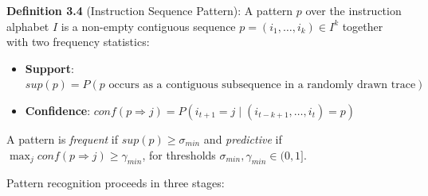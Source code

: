 \documentclass[
  sigconf,
  anonymous]{acmart}
\providecommand{\tightlist}{%
  \setlength{\itemsep}{0pt}\setlength{\parskip}{0pt}}
\begin{document}
\textbf{Definition 3.4} (Instruction Sequence Pattern): A pattern \(p\)
over the instruction alphabet \(I\) is a non-empty contiguous sequence
\(p = (i_1, \dots, i_k) \in I^k\) together with two frequency
statistics:

\begin{itemize}
\tightlist
\item
  \textbf{Support}:
  \(sup(p) = P(p \text{ occurs as a contiguous subsequence in a randomly drawn trace})\)
\item
  \textbf{Confidence}:
  \(conf(p \Rightarrow j) = P(i_{t+1} = j \mid (i_{t-k+1}, \dots, i_t) = p)\)
\end{itemize}

A pattern is \emph{frequent} if \(sup(p) \geq \sigma_{min}\) and
\emph{predictive} if \(\max_j conf(p \Rightarrow j) \geq \gamma_{min}\),
for thresholds \(\sigma_{min}, \gamma_{min} \in (0, 1]\).

Pattern recognition proceeds in three stages:
\end{document}
